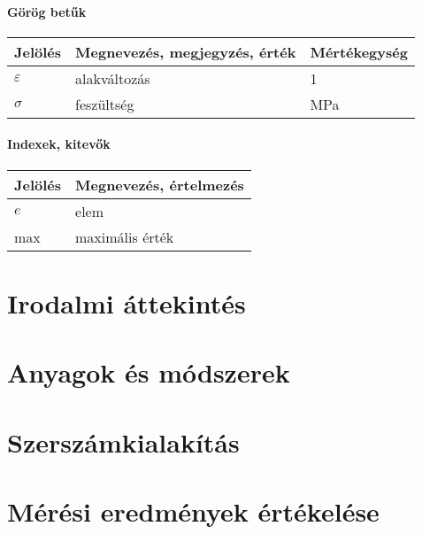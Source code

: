 \documentclass[12pt,a4paper,oneside]{report}
\begin{document}
\subsubsection*{Görög betűk}
\begin{center}
    \begin{tabular}{lp{10cm}l}
        \hline
        Jelölés & Megnevezés, megjegyzés, érték & Mértékegység \\
        \hline
                $\varepsilon$  & alakváltozás           & 1    \\
        $\sigma$  & feszültség                  & MPa             \\

        \hline
    \end{tabular}
\end{center}



\subsubsection*{Indexek, kitevők}
\begin{center}
    \begin{tabular}{lp{12.8cm}}
        \hline
        Jelölés & Megnevezés, értelmezés\\
        \hline
        $e$     & elem  \\
        max     & maximális érték        \\
        \hline
    \end{tabular}
\end{center}


\def\arraystretch{1}%

\cleardoublepage
{}
\chapter{Irodalmi áttekintés}

\chapter{Anyagok és módszerek}

\chapter{Szerszámkialakítás}

\chapter{Mérési eredmények értékelése}
\end{document}
